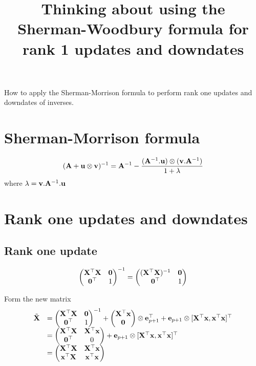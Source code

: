 \documentclass{amsart}
\title{Thinking about using the Sherman-Woodbury formula for rank 1 updates and downdates}
\begin{document}
\maketitle

How to apply the Sherman-Morrison formula to perform rank one updates and downdates of inverses.

\section{Sherman-Morrison formula}
\begin{equation}
({\bf A} + {\bf u} \otimes {\bf v})^{-1} = {\bf A}^{-1} - \frac{({\bf A}^{-1}.{\bf u}) \otimes ({\bf v}.{\bf A}^{-1})}{1 + \lambda}
\end{equation}
where $\lambda = {\bf v}. {\bf A}^{-1}. {\bf u}$

\section{Rank one updates and downdates}

\subsection{Rank one update}

\begin{equation*}
\begin{pmatrix}
{\bf X}^\top {\bf X} & {\bf 0} \\
{\bf 0}^\top & 1
\end{pmatrix}^{-1}
=
\begin{pmatrix}
({\bf X}^\top {\bf X})^{-1} & {\bf 0} \\
{\bf 0}^\top & 1
\end{pmatrix}
\end{equation*}

Form the new matrix
\begin{equation*}
\begin{array}{ll}
\tilde{{\bf X}}&= 
\begin{pmatrix}
{\bf X}^\top {\bf X} & {\bf 0} \\
{\bf 0}^\top & 1
\end{pmatrix}^{-1}
+
\begin{pmatrix}
{\bf X}^\top {\bf x} \\
{\bf 0}
\end{pmatrix} \otimes {\bf e}_{p+1}^\top
+
{\bf e}_{p+1} \otimes [{\bf X}^\top{\bf x}, {\bf x}^\top {\bf x}]^\top \\
&= \begin{pmatrix}
{\bf X}^\top {\bf X} & {\bf X}^\top {\bf x} \\
{\bf 0}^\top & 0
\end{pmatrix}
+
{\bf e}_{p+1} \otimes [{\bf X}^\top{\bf x}, {\bf x}^\top {\bf x}]^\top \\
&=
\begin{pmatrix}
{\bf X}^\top {\bf X} & {\bf X}^\top {\bf x} \\
{\bf x}^\top {\bf X} & {\bf x}^\top {\bf x}
\end{pmatrix}
\end{array}
\end{equation*}
\end{document}
